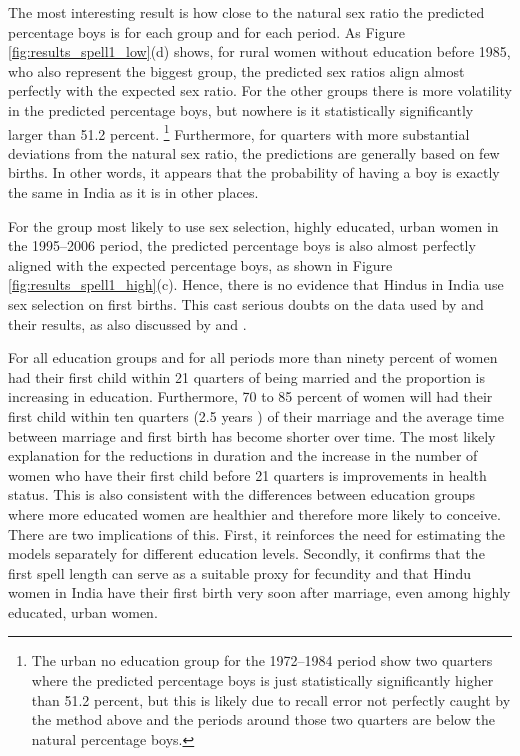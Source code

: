 \documentclass[12pt,letterpaper]{article}
\begin{document}
The most interesting result is how close to the natural sex ratio the predicted percentage
boys is for each group and for each period.
As Figure \ref{fig:results_spell1_low}(d) shows, for rural women without education before 1985, 
who also represent the biggest group, the predicted sex ratios align almost perfectly with 
the expected sex ratio.
For the other groups there is more volatility in the predicted percentage boys, but
nowhere is it statistically significantly larger than 51.2 percent.%
\footnote{
The urban no education group for the 1972--1984 period show two quarters where the predicted
percentage boys is just statistically significantly higher than 51.2 percent, but this
is likely due to recall error not perfectly caught by the method above
and the periods around those two quarters are below the natural percentage boys.
}
Furthermore, for quarters with more substantial deviations from the natural
sex ratio, the predictions are generally based on few births.
In other words, it appears that the probability of having a boy is exactly the same in 
India as it is in other places.

For the group most likely to use sex selection, highly
educated, urban women in the 1995--2006 period, the predicted percentage
boys is also almost perfectly aligned with the expected percentage boys, as shown
in Figure \ref{fig:results_spell1_high}(c).
Hence, there is no evidence that Hindus in India use sex selection on first births.
This cast serious doubts on the data used by \cite{jha06} and their results, as
also discussed by \cite{george06} and \cite{bhat06}.

For all education groups and for all periods more than ninety percent of women had their 
first child within 21 quarters of being married and the proportion is increasing in education.
Furthermore, 70 to 85 percent of women will had their first child within ten quarters 
(2.5 years ) of their marriage and the average time between marriage and first birth has 
become shorter over time.
The most likely explanation for the reductions in duration and the increase 
in the number of women who have their first child before 21 quarters is improvements
in health status.
This is also consistent with the differences between education groups where more
educated women are healthier and therefore more likely to conceive.
There are two implications of this.
First, it reinforces the need for estimating the models separately for different
education levels.
Secondly, it confirms that the first spell length can serve as a suitable
proxy for fecundity and that Hindu women in India have their first birth very soon
after marriage, even among highly educated, urban women.
\end{document}
